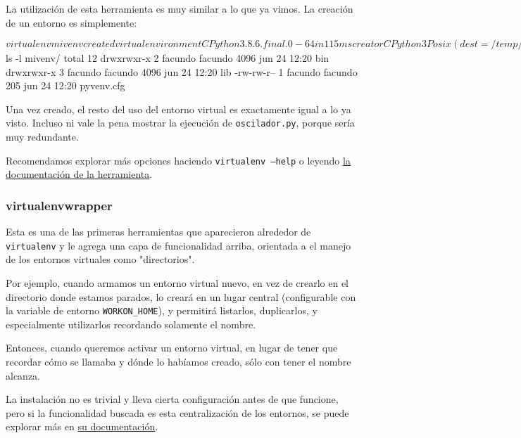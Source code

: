 La utilización de esta herramienta es muy similar a lo que ya vimos. La creación de un entorno es simplemente:

\begin{shell}
[/temp]$ virtualenv mivenv
created virtual environment CPython3.8.6.final.0-64 in 115ms
  creator CPython3Posix(dest=/temp/mivenv, clear=False, global=False)
  seeder FromAppData(download=False, pip=bundle, setuptools=bundle, wheel=bundle, via=copy)
    added seed packages: pip==20.1.1, pkg_resources==0.0.0, setuptools==44.0.0, wheel==0.34.2
  activators BashActivator,CShellActivator,FishActivator,PowerShellActivator,PythonActivator,XonshActivator
[/temp]$ ls -l mivenv/
total 12
drwxrwxr-x 2 facundo facundo 4096 jun 24 12:20 bin
drwxrwxr-x 3 facundo facundo 4096 jun 24 12:20 lib
-rw-rw-r-- 1 facundo facundo  205 jun 24 12:20 pyvenv.cfg
\end{shell}

Una vez creado, el resto del uso del entorno virtual es exactamente igual a lo ya visto. Incluso ni vale la pena mostrar la ejecución de \texttt{oscilador.py}, porque sería muy redundante.

Recomendamos explorar más opciones haciendo \texttt{virtualenv --help} o leyendo \href{https://virtualenv.pypa.io/en/latest/}{la documentación de la herramienta}.


\subsubsection{virtualenvwrapper}

Esta es una de las primeras herramientas que aparecieron alrededor de \texttt{virtualenv} y le agrega una capa de funcionalidad arriba, orientada a el manejo de los entornos virtuales como "directorios".

Por ejemplo, cuando armamos un entorno virtual nuevo, en vez de crearlo en el directorio donde estamos parados, lo creará en un lugar central (configurable con la variable de entorno \verb|WORKON_HOME|), y permitirá listarlos, duplicarlos, y especialmente utilizarlos recordando solamente el nombre.

Entonces, cuando queremos activar un entorno virtual, en lugar de tener que recordar cómo se llamaba y dónde lo habíamos creado, sólo con tener el nombre alcanza.

La instalación no es trivial y lleva cierta configuración antes de que funcione, pero si la funcionalidad buscada es esta centralización de los entornos, se puede explorar más en \href{https://virtualenvwrapper.readthedocs.io/en/latest/}{su documentación}.

